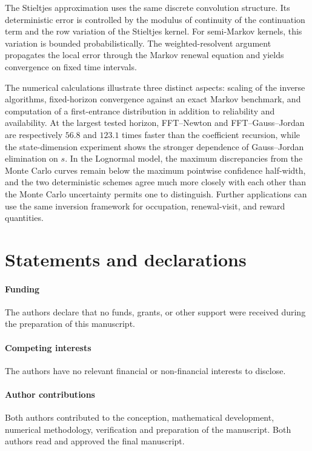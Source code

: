 \documentclass[3p,12pt,authoryear]{elsarticle}
\theoremstyle{definition}
\theoremstyle{remark}
\begin{document}
The Stieltjes approximation uses the same discrete convolution structure. Its deterministic error is controlled by the modulus of continuity of the continuation term and the row variation of the Stieltjes kernel. For semi-Markov kernels, this variation is bounded probabilistically. The weighted-resolvent argument propagates the local error through the Markov renewal equation and yields convergence on fixed time intervals.

The numerical calculations illustrate three distinct aspects: scaling of the inverse algorithms, fixed-horizon convergence against an exact Markov benchmark, and computation of a first-entrance distribution in addition to reliability and availability. At the largest tested horizon, FFT--Newton and FFT--Gauss--Jordan are respectively $56.8$ and $123.1$ times faster than the coefficient recursion, while the state-dimension experiment shows the stronger dependence of Gauss--Jordan elimination on $s$. In the Lognormal model, the maximum discrepancies from the Monte Carlo curves remain below the maximum pointwise confidence half-width, and the two deterministic schemes agree much more closely with each other than the Monte Carlo uncertainty permits one to distinguish. Further applications can use the same inversion framework for occupation, renewal-visit, and reward quantities.


\section*{Statements and declarations}

\paragraph{Funding}
The authors declare that no funds, grants, or other support were received during the preparation of this manuscript.

\paragraph{Competing interests}
The authors have no relevant financial or non-financial interests to disclose.

\paragraph{Author contributions}
Both authors contributed to the conception, mathematical development, numerical methodology, verification and preparation of the manuscript. Both authors read and approved the final manuscript.
\end{document}

